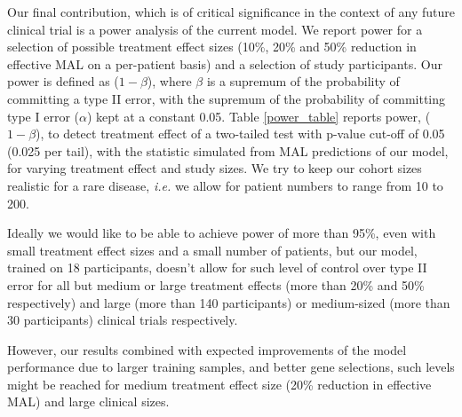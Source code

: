 \documentclass[10pt,letterpaper]{article}
\begin{document}
\label{poweranalysis}

Our final contribution, which is of critical significance in the context of any future clinical trial is a power analysis of the current model. We report power for a selection of possible treatment effect sizes (10\%, 20\% and 50\% reduction in effective MAL on a per-patient basis) and a selection of study participants. Our power is defined as ($1 - \beta$), where $\beta$ is a supremum of the probability of committing a type II error, with the supremum of the probability of committing type I error ($\alpha$) kept at a constant 0.05. Table \ref{power_table} reports power, ($1 - \beta$), to detect treatment effect of a two-tailed test with p-value cut-off of 0.05 (0.025 per tail), with the statistic simulated from MAL predictions of our model, for varying treatment effect and study sizes. We try to keep our cohort sizes realistic for a rare disease, {\it i.e.} we allow for patient numbers to range from 10 to 200.

Ideally we would like to be able to achieve power of more than 95\%, even with small treatment effect sizes and a small number of patients, but our model, trained on 18 participants, doesn't allow for such level of control over type II error for all but medium or large treatment effects (more than 20\% and 50\% respectively) and large (more than 140 participants) or medium-sized (more than 30 participants) clinical trials respectively.

However, our results combined with expected improvements of the model performance due to larger training samples, and better gene selections, such levels might be reached for medium treatment effect size (20\% reduction in effective MAL) and large clinical sizes.
\end{document}
